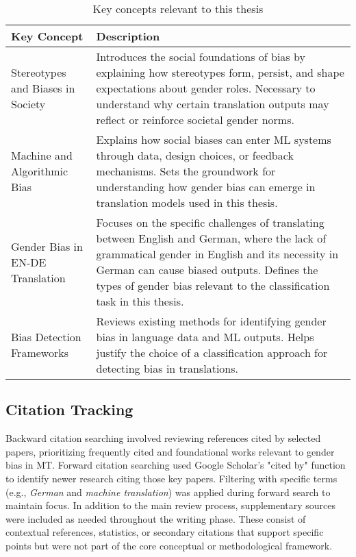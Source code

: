 \renewcommand{\arraystretch}{1.3}
\begin{table}[ht!]
\centering
\begin{tabularx}{\textwidth}{lX}
\toprule
\textbf{Key Concept} & \textbf{Description} \\
\midrule
Stereotypes and Biases in Society & Introduces the social foundations of bias by explaining how stereotypes form, persist, and shape expectations about gender roles. Necessary to understand why certain translation outputs may reflect or reinforce societal gender norms. \\

Machine and Algorithmic Bias & Explains how social biases can enter ML systems through data, design choices, or feedback mechanisms. Sets the groundwork for understanding how gender bias can emerge in translation models used in this thesis. \\

Gender Bias in EN-DE Translation & Focuses on the specific challenges of translating between English and German, where the lack of grammatical gender in English and its necessity in German can cause biased outputs. Defines the types of gender bias relevant to the classification task in this thesis. \\

Bias Detection Frameworks & Reviews existing methods for identifying gender bias in language data and ML outputs. Helps justify the choice of a classification approach for detecting bias in translations. \\

\bottomrule
\end{tabularx}
\caption{Key concepts relevant to this thesis}
\label{tab:key-concepts}
\end{table}

\subsection{Citation Tracking}
Backward citation searching involved reviewing references cited by selected papers, prioritizing frequently cited and foundational works relevant to gender bias in MT. Forward citation searching used Google Scholar's "cited by" function to identify newer research citing those key papers. Filtering with specific terms (e.g., \textit{German} and \textit{machine translation}) was applied during forward search to maintain focus. In addition to the main review process, supplementary sources were included as needed throughout the writing phase. These consist of contextual references, statistics, or secondary citations that support specific points but were not part of the core conceptual or methodological framework.

